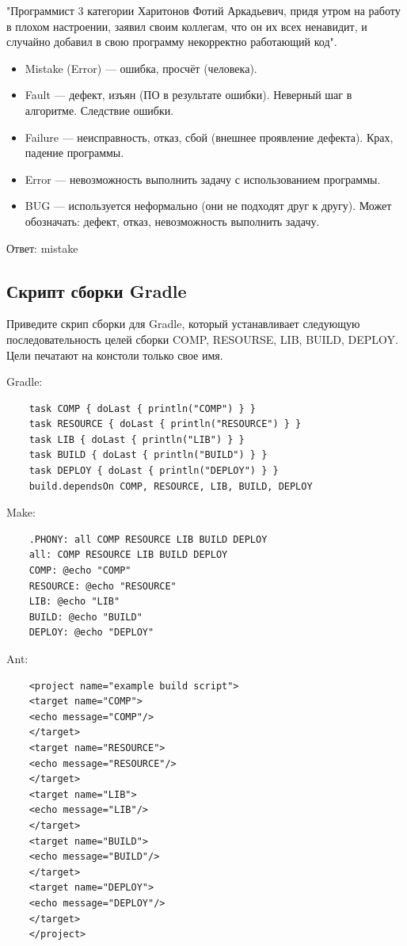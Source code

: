 \documentclass{article}
\begin{document}
"Программист 3 категории Харитонов Фотий Аркадьевич, придя утром на работу в плохом настроении, заявил своим коллегам, что он их всех ненавидит, и случайно добавил в свою программу некорректно работающий код".

\begin{itemize}
    \item Mistake (Error) — ошибка, просчёт (человека).
    \item Fault — дефект, изъян (ПО в результате ошибки). Неверный шаг в алгоритме. Следствие ошибки.
    \item Failure — неисправность, отказ, сбой (внешнее проявление дефекта). Крах, падение программы.
    \item Error — невозможность выполнить задачу с использованием программы.
    \item BUG — используется неформально (они не подходят друг к другу). Может обозначать: дефект, отказ, невозможность выполнить задачу.
\end{itemize}
Ответ: mistake

\subsection{Скрипт сборки Gradle}

Приведите скрип сборки для Gradle, который устанавливает следующую последовательность целей сборки COMP, RESOURSE,
LIB, BUILD, DEPLOY. Цели печатают на констоли только свое имя.

Gradle:
\begin{verbatim}
    task COMP { doLast { println("COMP") } }
    task RESOURCE { doLast { println("RESOURCE") } }
    task LIB { doLast { println("LIB") } }
    task BUILD { doLast { println("BUILD") } }
    task DEPLOY { doLast { println("DEPLOY") } }
    build.dependsOn COMP, RESOURCE, LIB, BUILD, DEPLOY
\end{verbatim}

Make:
\begin{verbatim}
    .PHONY: all COMP RESOURCE LIB BUILD DEPLOY
    all: COMP RESOURCE LIB BUILD DEPLOY
    COMP: @echo "COMP"
    RESOURCE: @echo "RESOURCE"
    LIB: @echo "LIB"
    BUILD: @echo "BUILD"
    DEPLOY: @echo "DEPLOY"
\end{verbatim}

Ant:
\begin{verbatim}
    <project name="example build script">
    <target name="COMP">
    <echo message="COMP"/>
    </target>
    <target name="RESOURCE">
    <echo message="RESOURCE"/>
    </target>
    <target name="LIB">
    <echo message="LIB"/>
    </target>
    <target name="BUILD">
    <echo message="BUILD"/>
    </target>
    <target name="DEPLOY">
    <echo message="DEPLOY"/>
    </target>
    </project>
\end{verbatim}
\end{document}
